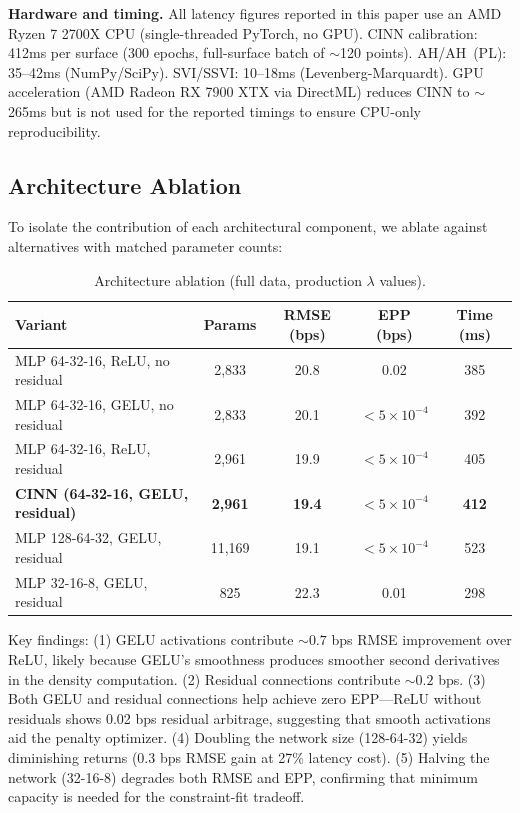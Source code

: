 \documentclass[11pt,a4paper]{article}
\begin{document}
\textbf{Hardware and timing.} All latency figures reported in this paper use an AMD Ryzen 7 2700X CPU (single-threaded PyTorch, no GPU). CINN calibration: 412ms per surface (300 epochs, full-surface batch of ${\sim}$120 points). AH/AH~(PL): 35--42ms (NumPy/SciPy). SVI/SSVI: 10--18ms (Levenberg-Marquardt). GPU acceleration (AMD Radeon RX 7900 XTX via DirectML) reduces CINN to ${\sim}$265ms but is not used for the reported timings to ensure CPU-only reproducibility.

\subsection{Architecture Ablation}

To isolate the contribution of each architectural component, we ablate against alternatives with matched parameter counts:

\begin{table}[h]
\centering
\caption{Architecture ablation (full data, production $\lambda$ values).}
\label{tab:arch_ablation}
\begin{tabular}{lcccc}
\toprule
\textbf{Variant} & \textbf{Params} & \textbf{RMSE (bps)} & \textbf{EPP (bps)} & \textbf{Time (ms)} \\
\midrule
MLP 64-32-16, ReLU, no residual & 2,833 & 20.8 & 0.02 & 385 \\
MLP 64-32-16, GELU, no residual & 2,833 & 20.1 & $< 5 \times 10^{-4}$ & 392 \\
MLP 64-32-16, ReLU, residual & 2,961 & 19.9 & $< 5 \times 10^{-4}$ & 405 \\
\textbf{CINN (64-32-16, GELU, residual)} & \textbf{2,961} & \textbf{19.4} & $< 5 \times 10^{-4}$ & \textbf{412} \\
MLP 128-64-32, GELU, residual & 11,169 & 19.1 & $< 5 \times 10^{-4}$ & 523 \\
MLP 32-16-8, GELU, residual & 825 & 22.3 & 0.01 & 298 \\
\bottomrule
\end{tabular}
\end{table}

Key findings: (1) GELU activations contribute ${\sim}0.7$ bps RMSE improvement over ReLU, likely because GELU's smoothness produces smoother second derivatives in the density computation. (2) Residual connections contribute ${\sim}0.2$ bps. (3) Both GELU and residual connections help achieve zero EPP---ReLU without residuals shows 0.02 bps residual arbitrage, suggesting that smooth activations aid the penalty optimizer. (4) Doubling the network size (128-64-32) yields diminishing returns (0.3 bps RMSE gain at 27\% latency cost). (5) Halving the network (32-16-8) degrades both RMSE and EPP, confirming that minimum capacity is needed for the constraint-fit tradeoff.
\end{document}
